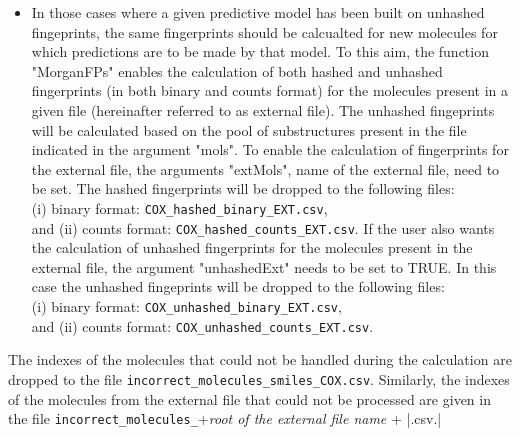 \documentclass[twoside,a4wide,12pt]{article}\usepackage[]{graphicx}\usepackage[]{color}
\begin{document}
\begin{itemize}
\item In those cases where a given predictive model has been built on unhashed fingeprints, the same fingerprints should be 
calcualted for new molecules for which predictions are to be made by that model. 
To this aim, the function "MorganFPs" enables the calculation of both hashed and unhashed fingerprints (in both binary and counts format) for the molecules present in a given file (hereinafter referred to as external file). The unhashed fingeprints will be calculated based on the pool of substructures present in the file indicated in the argument "mols".
To enable the calculation of fingerprints for the external file, the arguments "extMols", name of the external file, need to be set. 
The hashed fingerprints will be dropped to the following files:\\
(i) binary format: \verb|COX_hashed_binary_EXT.csv|, \\
and (ii) counts format: \verb|COX_hashed_counts_EXT.csv|.
If the user also wants the calculation of unhashed fingerprints for the molecules present in the external file, the argument "unhashedExt" needs to be set to TRUE. 
In this case the unhashed fingeprints will be dropped to the following files:\\
(i) binary format: \verb|COX_unhashed_binary_EXT.csv|,\\
and (ii) counts format: \verb|COX_unhashed_counts_EXT.csv|.

\end{itemize}

The indexes of the molecules that could not be handled during the calculation are dropped to the file \verb|incorrect_molecules_smiles_COX.csv|. Similarly, the indexes of the molecules from the external file that could not be processed are given in the file \verb|incorrect_molecules_|+{\it root of the external file name} + |.csv.|
\end{document}
